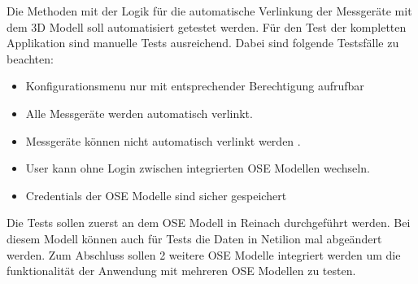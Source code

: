 Die Methoden mit der Logik für die automatische Verlinkung der Messgeräte mit dem 3D Modell soll automatisiert getestet werden.
\newline
Für den Test der kompletten Applikation sind manuelle Tests ausreichend. Dabei sind folgende Testsfälle zu beachten:
\begin{itemize}
  \item Konfigurationsmenu nur mit entsprechender Berechtigung aufrufbar
  \item Alle Messgeräte werden automatisch verlinkt.
  \item Messgeräte können nicht automatisch verlinkt werden .
  \item User kann ohne Login zwischen integrierten OSE Modellen wechseln.
  \item Credentials der OSE Modelle sind sicher gespeichert
\end{itemize}
Die Tests sollen zuerst an dem OSE Modell in Reinach durchgeführt werden. Bei diesem Modell können auch für Tests die Daten in Netilion mal abgeändert werden.
Zum Abschluss sollen 2 weitere OSE Modelle integriert werden um die funktionalität der Anwendung mit mehreren OSE Modellen zu testen.
